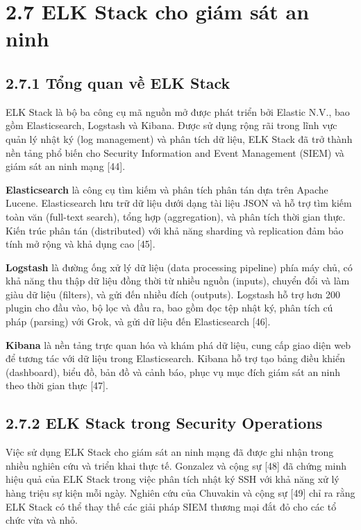 \documentclass[
  a4paper]{report}
\begin{document}
\section{2.7 ELK Stack cho giám sát an
ninh}\label{elk-stack-cho-giuxe1m-suxe1t-an-ninh}

\subsection{2.7.1 Tổng quan về ELK
Stack}\label{tux1ed5ng-quan-vux1ec1-elk-stack}

ELK Stack là bộ ba công cụ mã nguồn mở được phát triển bởi Elastic N.V.,
bao gồm Elasticsearch, Logstash và Kibana. Được sử dụng rộng rãi trong
lĩnh vực quản lý nhật ký (log management) và phân tích dữ liệu, ELK
Stack đã trở thành nền tảng phổ biến cho Security Information and Event
Management (SIEM) và giám sát an ninh mạng {[}44{]}.

\textbf{Elasticsearch} là công cụ tìm kiếm và phân tích phân tán dựa
trên Apache Lucene. Elasticsearch lưu trữ dữ liệu dưới dạng tài liệu
JSON và hỗ trợ tìm kiếm toàn văn (full-text search), tổng hợp
(aggregation), và phân tích thời gian thực. Kiến trúc phân tán
(distributed) với khả năng sharding và replication đảm bảo tính mở rộng
và khả dụng cao {[}45{]}.

\textbf{Logstash} là đường ống xử lý dữ liệu (data processing pipeline)
phía máy chủ, có khả năng thu thập dữ liệu đồng thời từ nhiều nguồn
(inputs), chuyển đổi và làm giàu dữ liệu (filters), và gửi đến nhiều
đích (outputs). Logstash hỗ trợ hơn 200 plugin cho đầu vào, bộ lọc và
đầu ra, bao gồm đọc tệp nhật ký, phân tích cú pháp (parsing) với Grok,
và gửi dữ liệu đến Elasticsearch {[}46{]}.

\textbf{Kibana} là nền tảng trực quan hóa và khám phá dữ liệu, cung cấp
giao diện web để tương tác với dữ liệu trong Elasticsearch. Kibana hỗ
trợ tạo bảng điều khiển (dashboard), biểu đồ, bản đồ và cảnh báo, phục
vụ mục đích giám sát an ninh theo thời gian thực {[}47{]}.

\subsection{2.7.2 ELK Stack trong Security
Operations}\label{elk-stack-trong-security-operations}

Việc sử dụng ELK Stack cho giám sát an ninh mạng đã được ghi nhận trong
nhiều nghiên cứu và triển khai thực tế. Gonzalez và cộng sự {[}48{]} đã
chứng minh hiệu quả của ELK Stack trong việc phân tích nhật ký SSH với
khả năng xử lý hàng triệu sự kiện mỗi ngày. Nghiên cứu của Chuvakin và
cộng sự {[}49{]} chỉ ra rằng ELK Stack có thể thay thế các giải pháp
SIEM thương mại đắt đỏ cho các tổ chức vừa và nhỏ.
\end{document}
